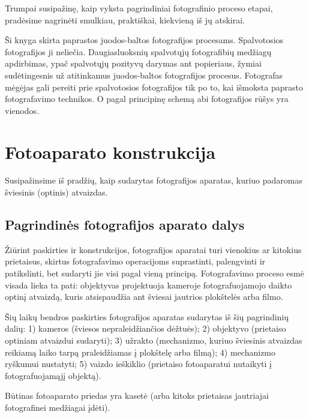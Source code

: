 \documentclass{book}
\begin{document}
			Trumpai susipažinę, kaip vyksta pagrindiniai fotografinio proceso etapai, pradėsime nagrinėti smulkiau, praktiškai, kiekvieną iš jų atskirai.

			Ši knyga skirta paprastos juodos-baltos fotografijos procesams. Spalvotosios fotografijos ji neliečia. Daugiasluoksnių spalvotųjų fotografibių medžiagų apdirbimas, ypač spalvotųjų pozityvų darymas ant popieriaus, žymiai sudėtingesnis už atitinkamus juodos-baltos fotografijos procesus. Fotografas mėgėjas gali pereiti prie spalvotosios fotografijos tik po to, kai išmoksta paprasto fotografavimo technikos. O pagal principinę schemą abi fotografijos rūšys yra vienodos.
		\section*{Fotoaparato konstrukcija}
			Susipažinsime iš pradžių, kaip sudarytas fotografijos aparatas, kuriuo padaromas šviesinis (optinis) atvaizdas.
			\subsection*{Pagrindinės fotografijos aparato dalys}
				Žiūrint paskirties ir konstrukcijos, fotografijos aparatai turi vienokius ar kitokius prietaisus, skirtus fotografavimo operacijoms suprastinti, palengvinti ir patikslinti, bet sudaryti jie visi pagal vieną principą. Fotografavimo proceso esmė visada lieka ta pati: objektyvas projektuoja kameroje fotografuojamojo daikto optinį atvaizdą, kuris atsispaudžia ant šviesai jautrios plokštelės arba filmo.

				Šių laikų bendros paskirties fotografijos aparatas sudarytas iš šių pagrindinių dalių: 1) kameros (šviesos nepraleidžiančios dėžtuės); 2) objektyvo (prietaiso optiniam atvaizdui sudaryti); 3) užrakto (mechanizmo, kuriuo šviesinis atvaizdas reikiamą laiko tarpą praleidžiamas į plokštelę arba filmą); 4) mechanizmo ryškumui nustatyti; 5) vaizdo ieškiklio (prietaiso fotoaparatui nutaikyti į fotografuojamąjį objektą).

				Būtinas fotoaparato priedas yra kasetė (arba kitoks prietaisas jautriajai fotografinei medžiagai įdėti).
\end{document}
